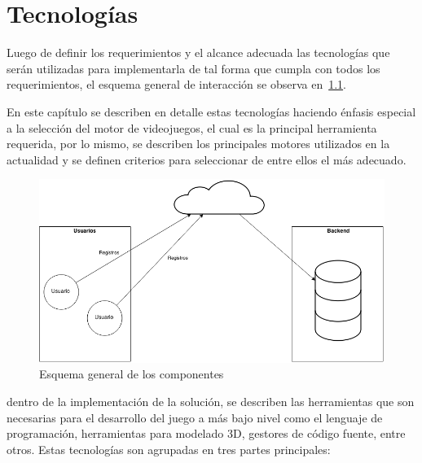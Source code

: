 \chapter{Tecnologías}
\label{chap:tecnologias}

Luego de definir los requerimientos y el alcance   adecuada las tecnologías que serán utilizadas para
implementarla de tal forma que cumpla con todos los requerimientos, el esquema
general de interacción se observa en~\ref{fig:componentes}.

En este capítulo se describen en detalle estas tecnologías haciendo énfasis
especial a la selección del motor de videojuegos, el cual es la principal
herramienta requerida, por lo mismo, se describen los principales motores
utilizados en la actualidad y se definen criterios para seleccionar de entre
ellos el más adecuado.


\begin{figure}
\begin{center}
    \includegraphics[scale=0.5]{tecnologias/images/completo.png}
\end{center}
\caption{Esquema general de los componentes}
\label{fig:componentes}
\end{figure}

 dentro de la implementación de la
solución, se describen las herramientas que son necesarias para el desarrollo
del juego a más bajo nivel como el lenguaje de programación, herramientas para
modelado 3D, gestores de código fuente, entre otros. Estas tecnologías son
agrupadas en tres partes principales:


